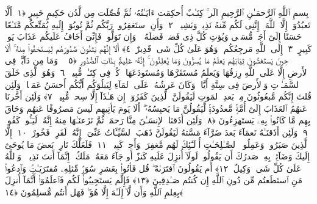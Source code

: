 
  
    
  
    
    

\nopagebreak
  بِسمِ ٱللَّهِ ٱلرَّحمَـٰنِ ٱلرَّحِيمِ
  الٓر ۚ كِتَـٰبٌ أُحكِمَت ءَايَـٰتُهُۥ ثُمَّ فُصِّلَت مِن لَّدُن حَكِيمٍ خَبِيرٍ ﴿١﴾
 أَلَّا تَعبُدُوٓا۟ إِلَّا ٱللَّهَ ۚ إِنَّنِى لَكُم مِّنهُ نَذِيرٌۭ وَبَشِيرٌۭ ﴿٢﴾
 وَأَنِ ٱستَغفِرُوا۟ رَبَّكُم ثُمَّ تُوبُوٓا۟ إِلَيهِ يُمَتِّعكُم مَّتَـٰعًا حَسَنًا إِلَىٰٓ أَجَلٍۢ مُّسَمًّۭى وَيُؤتِ كُلَّ ذِى فَضلٍۢ فَضلَهُۥ ۖ وَإِن تَوَلَّوا۟ فَإِنِّىٓ أَخَافُ عَلَيكُم عَذَابَ يَومٍۢ كَبِيرٍ ﴿٣﴾
 إِلَى ٱللَّهِ مَرجِعُكُم ۖ وَهُوَ عَلَىٰ كُلِّ شَىءٍۢ قَدِيرٌ ﴿٤﴾
 أَلَآ إِنَّهُم يَثنُونَ صُدُورَهُم لِيَستَخفُوا۟ مِنهُ ۚ أَلَا حِينَ يَستَغشُونَ ثِيَابَهُم يَعلَمُ مَا يُسِرُّونَ وَمَا يُعلِنُونَ ۚ إِنَّهُۥ عَلِيمٌۢ بِذَاتِ ٱلصُّدُورِ ﴿٥﴾
 ۞ وَمَا مِن دَآبَّةٍۢ فِى ٱلأَرضِ إِلَّا عَلَى ٱللَّهِ رِزقُهَا وَيَعلَمُ مُستَقَرَّهَا وَمُستَودَعَهَا ۚ كُلٌّۭ فِى كِتَـٰبٍۢ مُّبِينٍۢ ﴿٦﴾
 وَهُوَ ٱلَّذِى خَلَقَ ٱلسَّمَـٰوَٟتِ وَٱلأَرضَ فِى سِتَّةِ أَيَّامٍۢ وَكَانَ عَرشُهُۥ عَلَى ٱلمَآءِ لِيَبلُوَكُم أَيُّكُم أَحسَنُ عَمَلًۭا ۗ وَلَئِن قُلتَ إِنَّكُم مَّبعُوثُونَ مِنۢ بَعدِ ٱلمَوتِ لَيَقُولَنَّ ٱلَّذِينَ كَفَرُوٓا۟ إِن هَـٰذَآ إِلَّا سِحرٌۭ مُّبِينٌۭ ﴿٧﴾
 وَلَئِن أَخَّرنَا عَنهُمُ ٱلعَذَابَ إِلَىٰٓ أُمَّةٍۢ مَّعدُودَةٍۢ لَّيَقُولُنَّ مَا يَحبِسُهُۥٓ ۗ أَلَا يَومَ يَأتِيهِم لَيسَ مَصرُوفًا عَنهُم وَحَاقَ بِهِم مَّا كَانُوا۟ بِهِۦ يَستَهزِءُونَ ﴿٨﴾
 وَلَئِن أَذَقنَا ٱلإِنسَـٰنَ مِنَّا رَحمَةًۭ ثُمَّ نَزَعنَـٰهَا مِنهُ إِنَّهُۥ لَيَـُٔوسٌۭ كَفُورٌۭ ﴿٩﴾
 وَلَئِن أَذَقنَـٰهُ نَعمَآءَ بَعدَ ضَرَّآءَ مَسَّتهُ لَيَقُولَنَّ ذَهَبَ ٱلسَّيِّـَٔاتُ عَنِّىٓ ۚ إِنَّهُۥ لَفَرِحٌۭ فَخُورٌ ﴿١٠﴾
 إِلَّا ٱلَّذِينَ صَبَرُوا۟ وَعَمِلُوا۟ ٱلصَّـٰلِحَـٰتِ أُو۟لَـٰٓئِكَ لَهُم مَّغفِرَةٌۭ وَأَجرٌۭ كَبِيرٌۭ ﴿١١﴾
 فَلَعَلَّكَ تَارِكٌۢ بَعضَ مَا يُوحَىٰٓ إِلَيكَ وَضَآئِقٌۢ بِهِۦ صَدرُكَ أَن يَقُولُوا۟ لَولَآ أُنزِلَ عَلَيهِ كَنزٌ أَو جَآءَ مَعَهُۥ مَلَكٌ ۚ إِنَّمَآ أَنتَ نَذِيرٌۭ ۚ وَٱللَّهُ عَلَىٰ كُلِّ شَىءٍۢ وَكِيلٌ ﴿١٢﴾
 أَم يَقُولُونَ ٱفتَرَىٰهُ ۖ قُل فَأتُوا۟ بِعَشرِ سُوَرٍۢ مِّثلِهِۦ مُفتَرَيَـٰتٍۢ وَٱدعُوا۟ مَنِ ٱستَطَعتُم مِّن دُونِ ٱللَّهِ إِن كُنتُم صَـٰدِقِينَ ﴿١٣﴾
 فَإِلَّم يَستَجِيبُوا۟ لَكُم فَٱعلَمُوٓا۟ أَنَّمَآ أُنزِلَ بِعِلمِ ٱللَّهِ وَأَن لَّآ إِلَـٰهَ إِلَّا هُوَ ۖ فَهَل أَنتُم مُّسلِمُونَ ﴿١٤﴾
